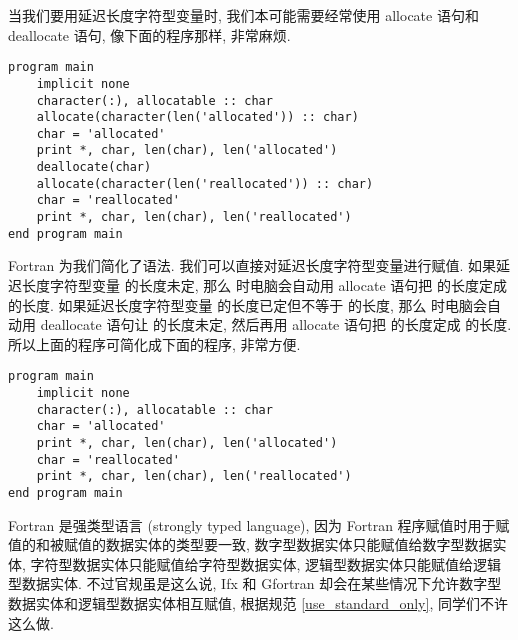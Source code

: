 当我们要用延迟长度字符型变量时, 我们本可能需要经常使用 allocate 语句和 deallocate 语句, 像下面的程序那样, 非常麻烦.
\begin{lstlisting}
program main
    implicit none
    character(:), allocatable :: char
    allocate(character(len('allocated')) :: char)
    char = 'allocated'
    print *, char, len(char), len('allocated')
    deallocate(char)
    allocate(character(len('reallocated')) :: char)
    char = 'reallocated'
    print *, char, len(char), len('reallocated')
end program main
\end{lstlisting}
Fortran 为我们简化了语法. 我们可以直接对延迟长度字符型变量进行赋值. 如果延迟长度字符型变量 \ttt{[var]} 的长度未定, 那么 \ttt{[var] = [expr]} 时电脑会自动用 allocate 语句把 \ttt{[var]} 的长度定成 \ttt{[expr]} 的长度. 如果延迟长度字符型变量 \ttt{[var]} 的长度已定但不等于 \ttt{[expr]} 的长度, 那么 \ttt{[var] = [expr]} 时电脑会自动用 deallocate 语句让 \ttt{[var]} 的长度未定, 然后再用 allocate 语句把 \ttt{[var]} 的长度定成 \ttt{[expr]} 的长度. 所以上面的程序可简化成下面的程序, 非常方便.
\begin{lstlisting}
program main
    implicit none
    character(:), allocatable :: char
    char = 'allocated'
    print *, char, len(char), len('allocated')
    char = 'reallocated'
    print *, char, len(char), len('reallocated')
end program main
\end{lstlisting}

Fortran 是强类型语言 (strongly typed language), 因为 Fortran 程序赋值时用于赋值的和被赋值的数据实体的类型要一致, 数字型数据实体只能赋值给数字型数据实体, 字符型数据实体只能赋值给字符型数据实体, 逻辑型数据实体只能赋值给逻辑型数据实体. 不过官规虽是这么说, Ifx 和 Gfortran 却会在某些情况下允许数字型数据实体和逻辑型数据实体相互赋值, 根据规范 \ref{use_standard_only}, 同学们不许这么做.

